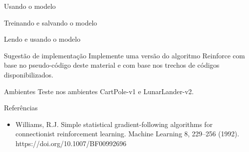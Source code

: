 \documentclass{beamer}
\begin{document}
\begin{frame}{Usando o modelo}
	
\end{frame}

\begin{frame}{Treinando e salvando o modelo}
	
\end{frame}

\begin{frame}{Lendo e usando o modelo}
	
\end{frame}

\begin{frame}
	\begin{alertblock}{Sugestão de implementação}
		Implemente uma versão do algoritmo Reinforce com base no pseudo-código deste material e com base nos trechos de códigos disponibilizados. 
	\end{alertblock}

	\begin{alertblock}{Ambientes}
	Teste nos ambientes CartPole-v1 e LunarLander-v2. 
	\end{alertblock}
\end{frame}
			
\begin{frame}{Referências}
	\begin{itemize}
		\item Williams, R.J. Simple statistical gradient-following algorithms for connectionist reinforcement learning. Machine Learning 8, 229–256 (1992). https://doi.org/10.1007/BF00992696
	\end{itemize}
\end{frame}
		
\end{document}
